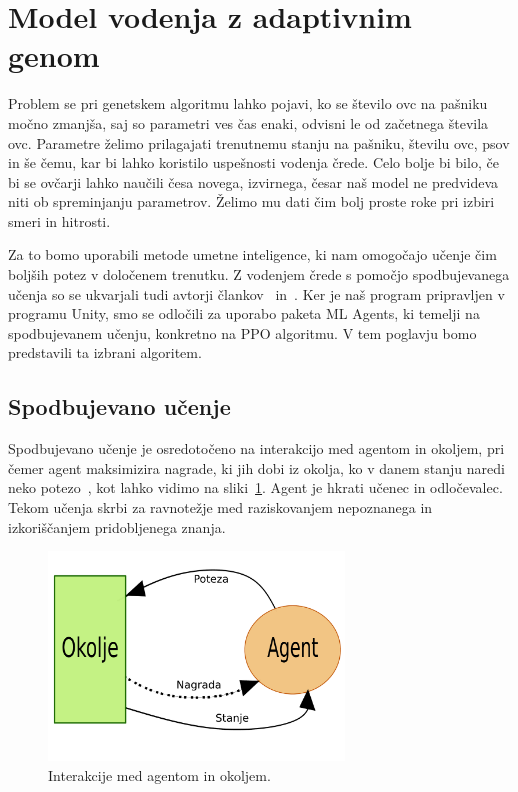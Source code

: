 \section{Model vodenja z adaptivnim genom}

Problem se pri genetskem algoritmu lahko pojavi, ko se število ovc na pašniku močno zmanjša, saj so parametri ves čas enaki, odvisni le od začetnega števila ovc. Parametre želimo prilagajati trenutnemu stanju na pašniku, številu ovc, psov in še čemu, kar bi lahko koristilo uspešnosti vodenja črede. Celo bolje bi bilo, če bi se ovčarji lahko naučili česa novega, izvirnega, česar naš model ne predvideva niti ob spreminjanju parametrov. Želimo mu dati čim bolj proste roke pri izbiri smeri in hitrosti.

Za to bomo uporabili metode umetne inteligence, ki nam omogočajo učenje čim boljših potez v določenem trenutku. Z vodenjem črede s pomočjo spodbujevanega učenja so se ukvarjali tudi avtorji člankov~\cite{obstacles} in~\cite{sarsa}. Ker je naš program pripravljen v programu Unity, smo se odločili za uporabo paketa ML Agents, ki temelji na spodbujevanem učenju, konkretno na PPO algoritmu. V tem poglavju bomo predstavili ta izbrani algoritem.

\subsection{Spodbujevano učenje}

Spodbujevano učenje je osredotočeno na interakcijo med agentom in okoljem, pri čemer agent maksimizira nagrade, ki jih dobi iz okolja, ko v danem stanju naredi neko potezo~\cite{reinforcement}, kot lahko vidimo na sliki~\ref{fig:reinforcement}. Agent je hkrati učenec in odločevalec. Tekom učenja skrbi za ravnotežje med raziskovanjem nepoznanega in izkoriščanjem pridobljenega znanja.

\begin{figure}[ht]  %
	\centering
	\includegraphics[width=0.7\textwidth]{../poglavja/images/reinforcement.pdf}
	\caption[Agent in okolje pri spodbujevanem učenju]{Interakcije med agentom in okoljem.} %
	\label{fig:reinforcement}
\end{figure}

